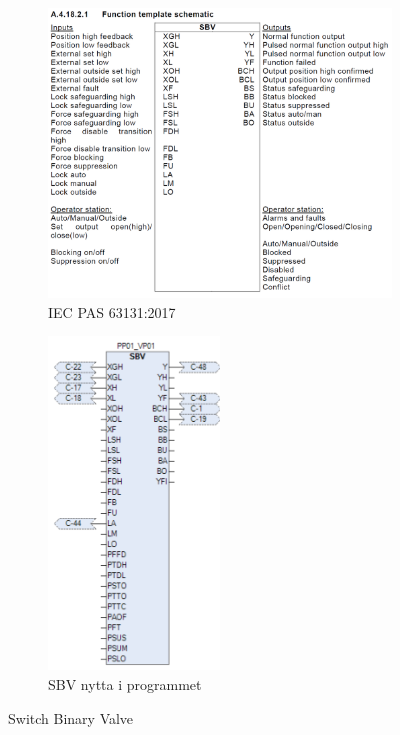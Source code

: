 \newpage

\begin{figure}[htbp]
    \centering
    \begin{subfigure}[b]{0.45\textwidth}
        \centering
        \includegraphics[width=1\textwidth]{Bilder/SBVBlokkIEC.png}
        \caption{\gls{IEC} \gls{PAS} 63131:2017 \citep{SBV}}\label{fig:Switch Binary Valve blokk IEC}
    \end{subfigure}
    \hfill
    \begin{subfigure}[b]{0.45\textwidth}
        \centering
        \includegraphics[width=0.5\textwidth]{Bilder/SBVBlokkIProgrammet.png}
        \caption{SBV nytta i programmet}\label{fig:Switch Binary Valve blokk i programmet}
    \end{subfigure}
    \caption{Switch Binary Valve}\label{fig:Switch Binary Valve}
\end{figure}
